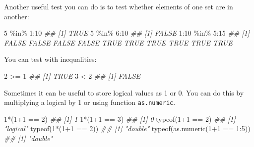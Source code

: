 \documentclass[
  13,
  letterpaper,
]{report}
\newenvironment{Shaded}{\begin{snugshade}}{\end{snugshade}}
\newcommand{\DecValTok}[1]{\textcolor[rgb]{0.68,0.00,0.00}{#1}}
\newcommand{\DocumentationTok}[1]{\textcolor[rgb]{0.37,0.37,0.37}{\textit{#1}}}
\newcommand{\FunctionTok}[1]{\textcolor[rgb]{0.28,0.35,0.67}{#1}}
\newcommand{\NormalTok}[1]{\textcolor[rgb]{0.00,0.23,0.31}{#1}}
\newcommand{\SpecialCharTok}[1]{\textcolor[rgb]{0.37,0.37,0.37}{#1}}
\begin{document}
Another useful test you can do is to test whether elements of one set
are in another:

\begin{Shaded}
\begin{Highlighting}[]
\DecValTok{5} \SpecialCharTok{\%in\%} \DecValTok{1}\SpecialCharTok{:}\DecValTok{10}
\DocumentationTok{\#\# [1] TRUE}
\DecValTok{5} \SpecialCharTok{\%in\%} \DecValTok{6}\SpecialCharTok{:}\DecValTok{10}
\DocumentationTok{\#\# [1] FALSE}
\DecValTok{1}\SpecialCharTok{:}\DecValTok{10} \SpecialCharTok{\%in\%} \DecValTok{5}\SpecialCharTok{:}\DecValTok{15}
\DocumentationTok{\#\#  [1] FALSE FALSE FALSE FALSE  TRUE  TRUE  TRUE  TRUE  TRUE  TRUE}
\end{Highlighting}
\end{Shaded}

You can test with inequalities:

\begin{Shaded}
\begin{Highlighting}[]
\DecValTok{2} \SpecialCharTok{\textgreater{}=} \DecValTok{1}
\DocumentationTok{\#\# [1] TRUE}
\DecValTok{3} \SpecialCharTok{\textless{}} \DecValTok{2}
\DocumentationTok{\#\# [1] FALSE}
\end{Highlighting}
\end{Shaded}

Sometimes it can be useful to store logical values as 1 or 0. You can do
this by multiplying a logical by 1 or using function
\texttt{as.numeric}.

\begin{Shaded}
\begin{Highlighting}[]
\DecValTok{1}\SpecialCharTok{*}\NormalTok{(}\DecValTok{1}\SpecialCharTok{+}\DecValTok{1} \SpecialCharTok{==} \DecValTok{2}\NormalTok{)}
\DocumentationTok{\#\# [1] 1}
\DecValTok{1}\SpecialCharTok{*}\NormalTok{(}\DecValTok{1}\SpecialCharTok{+}\DecValTok{1} \SpecialCharTok{==} \DecValTok{3}\NormalTok{)}
\DocumentationTok{\#\# [1] 0}
\FunctionTok{typeof}\NormalTok{(}\DecValTok{1}\SpecialCharTok{+}\DecValTok{1} \SpecialCharTok{==} \DecValTok{2}\NormalTok{)}
\DocumentationTok{\#\# [1] "logical"}
\FunctionTok{typeof}\NormalTok{(}\DecValTok{1}\SpecialCharTok{*}\NormalTok{(}\DecValTok{1}\SpecialCharTok{+}\DecValTok{1} \SpecialCharTok{==} \DecValTok{2}\NormalTok{))}
\DocumentationTok{\#\# [1] "double"}
\FunctionTok{typeof}\NormalTok{(}\FunctionTok{as.numeric}\NormalTok{(}\DecValTok{1}\SpecialCharTok{+}\DecValTok{1} \SpecialCharTok{==} \DecValTok{1}\SpecialCharTok{:}\DecValTok{5}\NormalTok{))}
\DocumentationTok{\#\# [1] "double"}
\end{Highlighting}
\end{Shaded}
\end{document}
